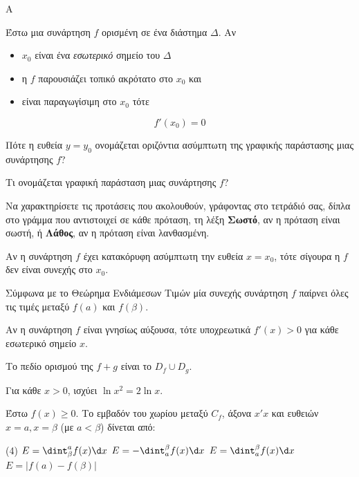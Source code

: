 \begin{thema}{A}
\begin{erwthma}
    \item Έστω μια συνάρτηση $ f $ ορισμένη σε ένα διάστημα $ \varDelta $. Αν \begin{itemize} \item $ x_0 $ είναι ένα \textit{εσωτερικό} σημείο του $ \varDelta $ \item η $ f $ παρουσιάζει τοπικό ακρότατο στο $ x_0 $ και \item είναι παραγωγίσιμη στο $ x_0 $ τότε \end{itemize} \[ f'(x_0)=0 \]
    \item Πότε η ευθεία $y=y_0$ ονομάζεται οριζόντια ασύμπτωτη της γραφικής παράστασης μιας συνάρτησης $f$?
    \item Τι ονομάζεται γραφική παράσταση μιας συνάρτησης $f$?
    \item Να χαρακτηρίσετε τις προτάσεις που ακολουθούν, γράφοντας στο τετράδιό σας, δίπλα στο γράμμα που αντιστοιχεί σε κάθε πρόταση, τη λέξη \textbf{Σωστό}, αν η πρόταση είναι σωστή, ή \textbf{Λάθος}, αν η πρόταση είναι λανθασμένη.
    \begin{alist}
        \item Αν η συνάρτηση $f$ έχει κατακόρυφη ασύμπτωτη την ευθεία $x = x_0$, τότε σίγουρα η $f$ δεν είναι συνεχής στο $x_0$.
        \item Σύμφωνα με το Θεώρημα Ενδιάμεσων Τιμών μία συνεχής συνάρτηση $f$ παίρνει όλες τις τιμές μεταξύ $f(a)$ και $f(\beta)$.
        \item Αν η συνάρτηση $f$ είναι γνησίως αύξουσα, τότε υποχρεωτικά $f'(x) > 0$ για κάθε εσωτερικό σημείο $x$.
        \item Το πεδίο ορισμού της $f+g$ είναι το $D_f\cup D_g$.
        \item Για κάθε $x>0$, ισχύει $\ln x^2 = 2\ln x$.
    \end{alist}
    \item Έστω $f(x) \ge 0$. Το εμβαδόν του χωρίου μεταξύ $C_f$, άξονα $x'x$ και ευθειών $x=a, x=\beta$ (με $a<\beta$) δίνεται από:
    \begin{tasks}[label=\let\textdexiakeraia\relax\alph*.](4)
        \task $E = \dint_\beta^a f(x) \d x$
        \task $E = - \dint_a^\beta f(x) \d x$
        \task $E = \dint_a^\beta f(x) \d x$
        \task $E = |f(a) - f(\beta)|$
    \end{tasks}
\end{erwthma}
\end{thema}


